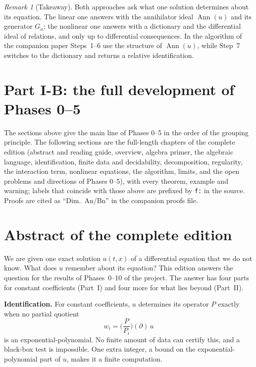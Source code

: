 \documentclass[11pt]{article}
\theoremstyle{plain}
\theoremstyle{definition}
\theoremstyle{remark}
\newtheorem{remark}[theorem]{Remark}
\DeclareMathOperator{\Ann}{Ann}             %
\newenvironment{keypoint}{\begin{remark}[Takeaway]}{\end{remark}}
\begin{document}
\begin{keypoint}
Both approaches ask what one solution determines about its equation. The linear one answers with the annihilator ideal $\Ann(u)$ and its generator $G_u$; the nonlinear one answers with a dictionary and the differential ideal of relations, and only up to differential consequences. In the algorithm of the companion paper Steps~1--6 use the structure of $\Ann(u)$, while Step~7 switches to the dictionary and returns a relative identification.
\end{keypoint}




\section*{Part I-B: the full development of Phases 0--5}
\noindent The sections above give the main line of Phases 0--5 in the order of the grouping principle. The following sections are the full-length chapters of the complete edition (abstract and reading guide, overview, algebra primer, the algebraic language, identification, finite data and decidability,
decomposition, regularity, the interaction term, nonlinear equations, the algorithm, limits, and the open problems and directions of Phases 0--5), with every theorem, example and warning; labels that coincide with those above are prefixed by \texttt{f:} in the source. Proofs are cited as ``Dim.~An/Bn'' in the companion proofs file.

\section*{Abstract of the complete edition}

We are given one exact solution $u(t,x)$ of a differential equation that we do not know. What does $u$ remember about its equation? This edition answers the question for the results of Phases~0--10 of the project. The answer has four parts for constant coefficients (Part~I) and four more for what lies beyond (Part~II).

\textbf{Identification.} For constant coefficients, $u$ determines its operator $P$ exactly when no partial quotient
\[
w_i=\Big(\frac{P}{P_i}\Big)(\partial)\,u
\]
is an exponential-polynomial. No finite amount of data can certify this, and a black-box test is impossible. One extra integer, a bound on the exponential-polynomial part of $u$, makes it a finite computation.
\end{document}
